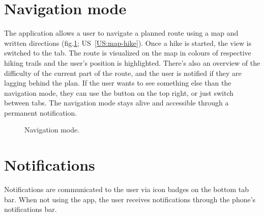 \section{Navigation mode}
The application allows a user to navigate a planned route using a map and written directions (fig.\ref{fig:navigation}; US~\ref{US:map-hike}).
Once a hike is started, the view is switched to the  tab.
The route is visualized on the map in colours of respective hiking trails and the user's position is highlighted.
There's also an overview of the difficulty of the current part of the route, and the user is notified if they are lagging behind the plan.
If the user wants to see something else than the navigation mode, they can use the  button on the top right, or just switch between tabs.
The navigation mode stays alive and accessible through a permanent notification.

\begin{figure}[h!]
    \centering
    \caption{Navigation mode.}
    \label{fig:navigation}
\end{figure}

\section{Notifications}
Notifications are communicated to the user via icon badges on the bottom tab bar.
When not using the app, the user receives notifications through the phone's notifications bar.
